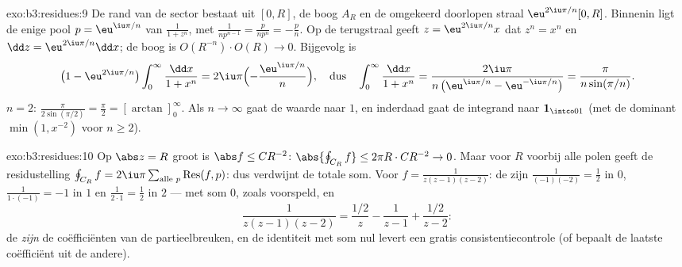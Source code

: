 \begin{solution}{exo:b3:residues:9}
De rand van de sector bestaat uit $[0, R]$, de boog $A_R$ en de
omgekeerd doorlopen straal $\eu^{2\iu\pi/n}[0, R]$. Binnenin ligt
de enige pool $p = \eu^{\iu\pi/n}$ van $\frac1{1+z^n}$, met
 $\frac1{np^{n-1}} = \frac{p}{np^n} = -\frac pn$. Op de
terugstraal geeft $z = \eu^{2\iu\pi/n}x$ dat $z^n = x^n$ en $\dd
z = \eu^{2\iu\pi/n}\dd x$; de boog is $O(R^{-n})\cdot O(R) \to
0$. Bijgevolg is
\[
\bigl(1 - \eu^{2\iu\pi/n}\bigr)
\int_0^\infty\frac{\dd x}{1 + x^n}
= 2\iu\pi\Bigl(-\frac{\eu^{\iu\pi/n}}n\Bigr),
\quad\text{dus}\quad
\int_0^\infty\frac{\dd x}{1+x^n}
= \frac{2\iu\pi}{n\,\bigl(\eu^{\iu\pi/n} -
\eu^{-\iu\pi/n}\bigr)} = \frac{\pi}{n\sin(\pi/n)} .
\]
$n = 2$: $\frac\pi{2\sin(\pi/2)} = \frac\pi2 =
[\arctan]_0^\infty$. Als $n \to \infty$ gaat de waarde naar $1$,
en inderdaad gaat de integrand naar $\mathbf 1_{\intco01}$ (met
de dominant $\min(1, x^{-2})$ voor $n \geq 2$).
\end{solution}

\begin{solution}{exo:b3:residues:10}
Op $\abs z = R$ groot is $\abs f \leq C R^{-2}$:
$\abs{\oint_{C_R} f} \leq 2\pi R\cdot CR^{-2} \to 0$. Maar voor
$R$ voorbij alle polen geeft de residustelling $\oint_{C_R}f =
2\iu\pi\sum_{\text{alle }p}\operatorname{Res}(f, p)$: dus
verdwijnt de totale som. Voor $f = \frac1{z(z-1)(z-2)}$: de
 zijn $\frac1{(-1)(-2)} = \frac12$ in $0$,
$\frac1{1\cdot(-1)} = -1$ in $1$ en $\frac1{2\cdot1} = \frac12$
in $2$ --- met som $0$, zoals voorspeld, en
\[
\frac1{z(z-1)(z-2)} = \frac{1/2}{z} - \frac1{z - 1} +
\frac{1/2}{z-2} :
\]
de  \emph{zijn} de coëfficiënten van de partieelbreuken,
en de identiteit met som nul levert een gratis
consistentiecontrole (of bepaalt de laatste coëfficiënt uit de
andere).
\end{solution}


